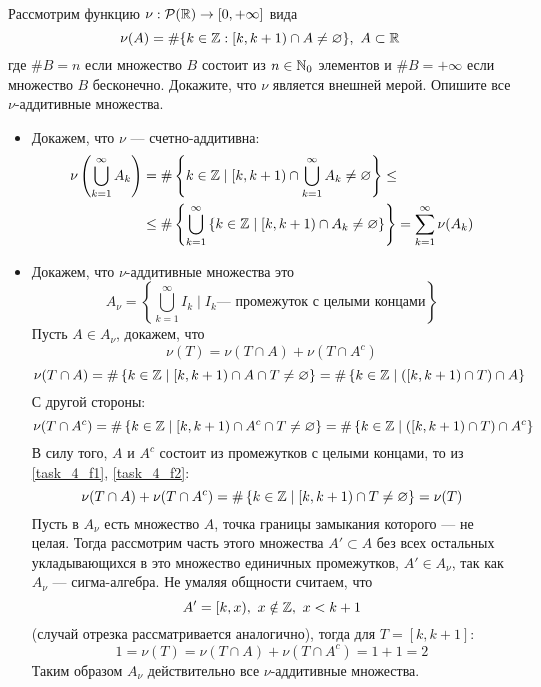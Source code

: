 \begin{task}{4}
	Рассмотрим функцию $\nu: \mathcal{P}(\mathbb{R}) \rightarrow [0, +\infty]$ вида 
	$$
	\nu(A) = \#\{k \in \mathbb{Z}: [k, k+1)\cap A \neq \varnothing\},~ A \subset \mathbb{R}
	$$ 
где $\#B = n$ если множество $B$ состоит из $n \in \mathbb{N}_0$ элементов и $\#B = +\infty$ если множество $B$ бесконечно. Докажите, что $\nu$ является внешней мерой. Опишите все $\nu$-аддитивные множества.
\end{task}

\begin{solution}
	\begin{itemize}
		\item Докажем, что $\nu$ --- счетно-аддитивна:
		\begin{align*}
			\nu\left(\bigcup_{k=1}^{\infty} A_k\right) &= \#\left\{k \in \mathbb{Z} \mid 
			[k,k+1) \cap \bigcup_{k=1}^{\infty}A_k \neq \varnothing\right\} \leq \\ 
			&\leq \#\left\{\bigcup_{k=1}^{\infty}\left\{k\in \mathbb{Z} \mid 
			[k,k+1)\cap A_k \neq \varnothing \right\}\right\} = \sum_{k=1}^{\infty}\nu(A_k)
		\end{align*}
	
		\item 
		Докажем, что $\nu$-аддитивные множества это 
		$$
		A_\nu = \left\{\bigcup_{k=1}^{\infty}I_k\mid I_k \text{--- промежуток с целыми концами}\right\}
		$$
		Пусть $A \in A_\nu$, докажем, что 
		$$
		\nu(T) = \nu(T \cap A ) + \nu(T \cap A^c)
		$$
		\begin{equation}\label{task_4_f1}
		\nu(T\cap A) = \#\left\{k \in \mathbb{Z} \mid [k,k+1)\cap A\cap T \neq \varnothing \right\} = \#\left\{k \in \mathbb{Z} \mid ([k,k+1) \cap T)\cap A \right\}
		\end{equation}
		С другой стороны:
		\begin{equation}\label{task_4_f2}
		\nu(T\cap A^c) = \#\left\{k \in \mathbb{Z} \mid [k,k+1)\cap A^c\cap T \neq \varnothing \right\} = \#\left\{k \in \mathbb{Z} \mid ([k,k+1) \cap T)\cap A^c \right\}
		\end{equation}
		В силу того, $A$ и $A^c$ состоит из промежутков с целыми концами, то из \ref{task_4_f1}, \ref{task_4_f2}:
		$$
		\nu(T \cap A) + \nu(T \cap A^c) = \#\left\{k\in \mathbb{Z} \mid [k,k+1) \cap T \neq \varnothing \right\} = \nu(T)
		$$
		Пусть в $A_\nu$ есть множество $A$, точка границы замыкания которого --- не целая. 
		Тогда рассмотрим часть этого множества $A' \subset A$ без всех остальных укладывающихся в это множество
		единичных промежутков, $A' \in A_\nu$, так как $A_\nu$ --- сигма-алгебра. Не умаляя общности считаем, что 
		$$
		A' = [k,x), ~ x\notin \mathbb{Z},~ x < k+1
		$$
		(случай отрезка рассматривается аналогично), тогда для $T = [k,k+1]$:
		$$
		1 = \nu(T) = \nu(T\cap A) + \nu(T \cap A^c) = 1 + 1 =2
		$$
		Таким образом $A_\nu$ действительно все $\nu$-аддитивные множества.
		\end{itemize}
	
	
\end{solution}

